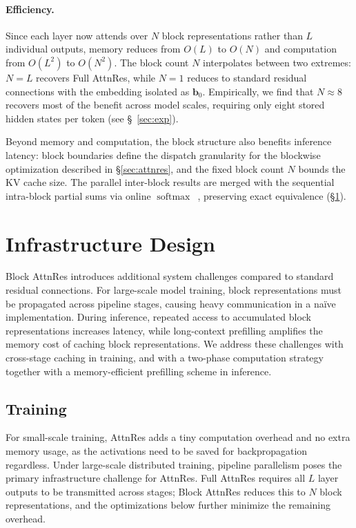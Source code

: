 

\paragraph{Efficiency.}
Since each layer now attends over $N$ block representations rather than $L$ individual outputs, memory reduces from $O(L)$ to $O(N)$ and computation from $O(L^2)$ to $O(N^2)$.
The block count $N$ interpolates between two extremes: $N = L$ recovers Full AttnRes, while $N = 1$ reduces to standard residual connections with the embedding isolated as $\bm{b}_0$.
Empirically, we find that $N \approx 8$ recovers most of the benefit across model scales, requiring only eight stored hidden states per token (see \S~\ref{sec:exp}).

Beyond memory and computation, the block structure also benefits inference latency: block boundaries define the dispatch granularity for the blockwise optimization described in \S\ref{sec:attnres}, and the fixed block count $N$ bounds the KV cache size. The parallel inter-block results are merged with the sequential intra-block partial sums via online $\operatorname{softmax}$~\citep{milakov2018online}, preserving exact equivalence (\S\ref{sec:infra}).

\section{Infrastructure Design}
\label{sec:infra}

Block AttnRes introduces additional system challenges compared to standard residual connections. For large-scale model training, block representations must be propagated across pipeline stages, causing heavy communication in a na\"ive implementation. During inference, repeated access to accumulated block representations increases latency, while long-context prefilling amplifies the memory cost of caching block representations. We address these challenges with cross-stage caching in training, and with a two-phase computation strategy together with a memory-efficient prefilling scheme in inference.

\subsection{Training}
\label{sec:infra-training}
For small-scale training, AttnRes adds a tiny computation overhead and no extra memory usage, as the activations need to be saved for backpropagation regardless.
Under large-scale distributed training, pipeline parallelism poses the primary infrastructure challenge for AttnRes.
Full AttnRes requires all $L$ layer outputs to be transmitted across stages; Block AttnRes reduces this to $N$ block representations, and the optimizations below further minimize the remaining overhead.

